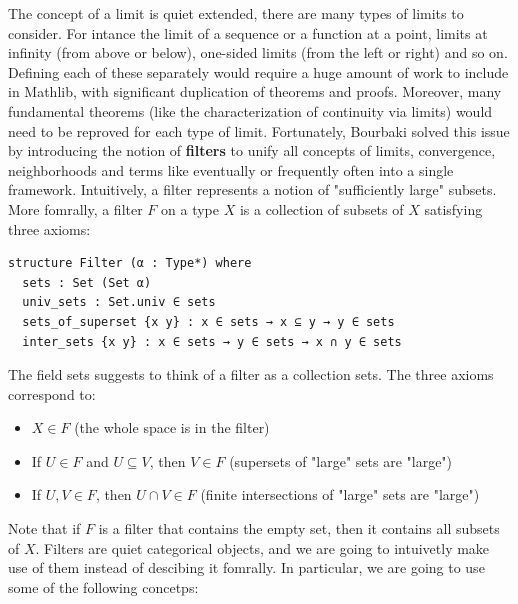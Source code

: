 The concept of a limit is quiet extended, there are many
types of limits to consider.
For intance the limit of a sequence or a function at a point,
limits at infinity (from above or below), one-sided limits (from the left or right)
and so on.
Defining each of these separately would require a
huge amount of work to include in Mathlib,
with significant duplication of theorems and proofs.
Moreover, many fundamental theorems
(like the characterization of continuity via limits)
would need to be reproved for each type of limit.
Fortunately, Bourbaki solved this issue by introducing the notion
of \textbf{filters} to unify
all concepts of limits, convergence, neighborhoods and terms like eventually or
frequently often into a single framework.
Intuitively, a filter represents a notion of "sufficiently large" subsets.
More fomrally, a filter $F$ on a type $X$ is a collection of subsets
of $X$ satisfying three axioms:
\begin{lstlisting}[language=lean]
structure Filter (α : Type*) where
  sets : Set (Set α)
  univ_sets : Set.univ ∈ sets
  sets_of_superset {x y} : x ∈ sets → x ⊆ y → y ∈ sets
  inter_sets {x y} : x ∈ sets → y ∈ sets → x ∩ y ∈ sets
\end{lstlisting}
The field sets suggests to think of a filter as
a collection sets. The three axioms correspond to:
\begin{itemize}
    \item  $X \in F$ (the whole space is in the filter)
    \item  If $U \in F$ and $U \subseteq V$, then $V \in F$
          (supersets of "large" sets are "large")
    \item  If $U, V \in F$, then $U \cap V \in F$
          (finite intersections of "large" sets are "large")
\end{itemize}
Note that if $F$ is a filter that contains the empty set,
then it contains all subsets of $X$.
Filters are quiet categorical objects, and we are going
to intuivetly make use of them instead of descibing it fomrally.
In particular, we are going to use some of the following concetps:
